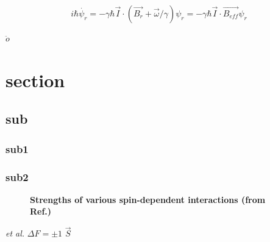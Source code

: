 \documentclass[pdftex,letterpaper,12pt]{report}
\begin{document}
	
\begin{equation}
i\hbar \dot{\psi_{r}}=-\gamma \hbar \vec{I}\cdot(\vec{B_{r}} + \vec{\omega}/\gamma)\psi_{r}=-\gamma \hbar \vec{I}\cdot\vec{B_{eff}}\psi_{r}
\end{equation}

$\ddot{o}$

\section{section}
\subsection{sub}
\subsubsection{sub1}
\subsubsection{sub2}

\begin{figure}[H]
	\centering
	\caption{{\bf Strengths of various spin-dependent interactions (from Ref.\@ \cite{WalkerHapper})}}
	\label{SpinExchange}
\end{figure}

\emph{et al.}
$\Delta F=\pm1$
$\vec{S}$


\end{document}
